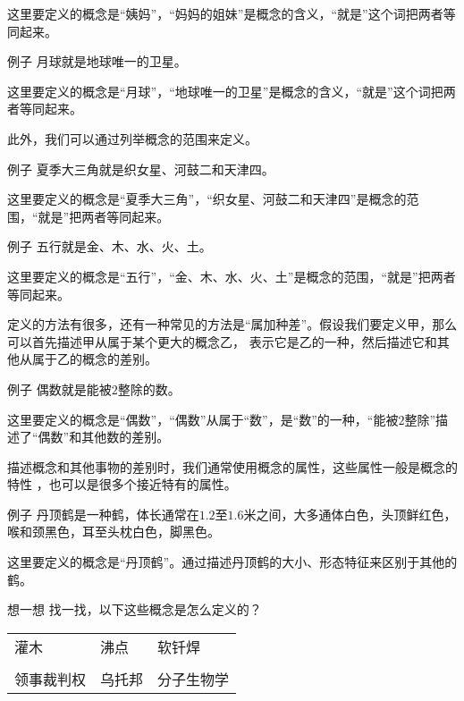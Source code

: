 \documentclass[12pt,UTF8,a4paper]{article}
\begin{document}
这里要定义的概念是“姨妈”，“妈妈的姐妹”是概念的含义，“就是”这个词把两者等同起来。

\begin{blockin}{例子}
    月球就是地球唯一的卫星。 
\end{blockin}
    
这里要定义的概念是“月球”，“地球唯一的卫星”是概念的含义，“就是”这个词把两者等同起来。

此外，我们可以通过列举概念的范围来定义。

\begin{blockin}{例子}
    夏季大三角就是织女星、河鼓二和天津四。
\end{blockin}

这里要定义的概念是“夏季大三角”，“织女星、河鼓二和天津四”是概念的范围，“就是”把两者等同起来。

\begin{blockin}{例子}
    五行就是金、木、水、火、土。
\end{blockin}

这里要定义的概念是“五行”，“金、木、水、火、土”是概念的范围，“就是”把两者等同起来。

定义的方法有很多，还有一种常见的方法是“属加种差”。假设我们要定义甲，那么可以首先描述甲从属于某个更大的概念乙，
表示它是乙的一种，然后描述它和其他从属于乙的概念的差别。

\begin{blockin}{例子}
    偶数就是能被$2$整除的数。
\end{blockin}

这里要定义的概念是“偶数”，“偶数”从属于“数”，是“数”的一种，“能被$2$整除”描述了“偶数”和其他数的差别。

描述概念和其他事物的差别时，我们通常使用概念的属性，这些属性一般是概念的特性
，也可以是很多个接近特有的属性。

\begin{blockin}{例子}
    丹顶鹤是一种鹤，体长通常在$1.2$至$1.6$米之间，大多通体白色，头顶鲜红色，喉和颈黑色，耳至头枕白色，脚黑色。
\end{blockin}

这里要定义的概念是“丹顶鹤”。通过描述丹顶鹤的大小、形态特征来区别于其他的鹤。

\begin{blockaft}{想一想}
    \noindent 找一找，以下这些概念是怎么定义的？\\
    \begin{center}
        \begin{tabular}{p{8em}<{\centering} p{8em}<{\centering} p{8em}<{\centering} }
            灌木 & 沸点 & 软钎焊 \\
            & & \\
            领事裁判权 & 乌托邦 & 分子生物学 \\
        \end{tabular}
    \end{center}
\end{blockaft}
\end{document}
